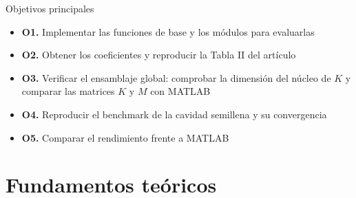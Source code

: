 \documentclass{beamer}
\begin{document}
\begin{frame}{Objetivos principales}
  \begin{itemize}
    \item \textbf{O1.} Implementar las funciones de base y los módulos para evaluarlas
    \item \textbf{O2.} Obtener los coeficientes y reproducir la Tabla II del artículo
    \item \textbf{O3.} Verificar el ensamblaje global: comprobar la dimensión del
      núcleo de $K$ y comparar las matrices $K$ y $M$ con MATLAB
    \item \textbf{O4.} Reproducir el benchmark de la cavidad semillena y su convergencia
    \item \textbf{O5.} Comparar el rendimiento frente a MATLAB
  \end{itemize}
\end{frame}

\section{Fundamentos teóricos}

\begin{frame}
  \sectionpage
\end{frame}
\end{document}
